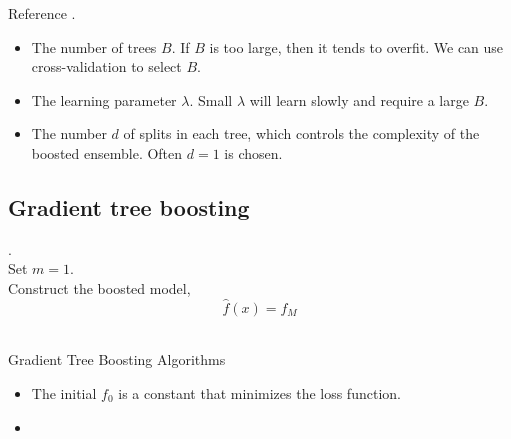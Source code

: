 \begin{refsection}
\begin{remark}
Reference \cite[322]{james2013introduction}.
\end{remark}

\begin{remark}\hfill
\begin{itemize}
	\item The number of trees $B$. If $B$ is too large, then it tends to overfit. We can use cross-validation to select $B$.
	\item The learning parameter $\lambda$. Small $\lambda$ will learn slowly and require a large $B$.
	\item The number $d$ of splits in each tree, which controls the complexity of the boosted ensemble. Often $d=1$ is chosen. 
\end{itemize}
\end{remark}



\subsection{Gradient tree boosting }

\begin{algorithm}[H]
	\SetAlgoLined
	.\\
	Set $m = 1$. \\
	Construct the boosted model,
	$$\hat{f}(x) = f_M$$\\
	\caption{Gradient Tree Boosting Algorithms}
\end{algorithm}


\begin{remark}[interpretation]\hfill
	\begin{itemize}
		\item The initial $f_0$ is a constant that minimizes the loss function.
		\item 
	\end{itemize}
\end{remark}


\end{refsection}
